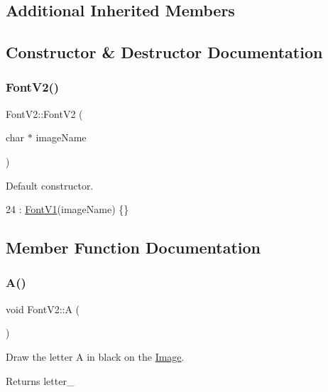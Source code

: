 \subsection*{Additional Inherited Members}


\subsection{Constructor \& Destructor Documentation}
\mbox{\label{class_font_v2_aecf9c03af709aa99c23f5c785e798ef4}} 
\subsubsection{\texorpdfstring{Font\+V2()}{FontV2()}}
{\footnotesize\ttfamily Font\+V2\+::\+Font\+V2 (\begin{DoxyParamCaption}\item[{char $\ast$}]{image\+Name }\end{DoxyParamCaption})\hspace{0.3cm}{\ttfamily [inline]}}



Default constructor. 


\begin{DoxyCode}
24 : \mbox{\hyperlink{class_font_v1_ada1ed699d42679f81146af4bc20db006}{FontV1}}(imageName) \{\}
\end{DoxyCode}


\subsection{Member Function Documentation}
\mbox{\label{class_font_v2_ae1a96e014f4cc9e4447b0a2d947f4a33}} 
\subsubsection{\texorpdfstring{A()}{A()}}
{\footnotesize\ttfamily void Font\+V2\+::A (\begin{DoxyParamCaption}{ }\end{DoxyParamCaption})}



Draw the letter A in black on the \mbox{\hyperlink{class_image}{Image}}. 

\begin{DoxyReturn}{Returns}
letter\+\_\+ 
\end{DoxyReturn}


